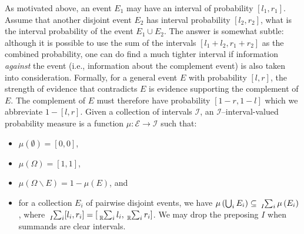 \documentclass{article}
\theoremstyle{remark}
\newcommand{\events}{\ensuremath{\mathcal{E}}}
\newcommand{\pmeas}{\ensuremath{\mu}}
\newcommand{\necess}{{\mbox{\wesa{certain}}}}
\newcommand{\yutsung}[1]{\fbox{\begin{minipage}{0.9\textwidth}\color{purple}{Yu-Tsung says: #1}\end{minipage}}}
\begin{document}
As motivated above, an event $E_1$ may have an interval of probability
$[l_1,r_1]$. Assume that another disjoint event $E_2$ has interval
probability $[l_2,r_2]$, what is the interval probability of the event
$E_1 \cup E_2$. The answer is somewhat subtle: although it is possible
to use the sum of the intervals $[l_1+l_2,r_1+r_2]$ as the combined
probability, one can do find a much tighter interval if information
\emph{against} the event (i.e., information about the complement
event) is also taken into consideration. Formally, for a general event
$E$ with probability $[l,r]$, the strength of evidence that
contradicts $E$ is evidence supporting the complement of $E$. The
complement of $E$ must therefore have probability
$\left[1-r,1-l\right]$ which we abbreviate $1-\left[l,r\right]$. Given
a collection of intervals $\mathscr{I}$, an
$\mathscr{I}$--interval-valued probability measure is a function
$\pmeas : \events \rightarrow \mathscr{I}$ such that:
\begin{itemize}
\item $\pmeas(\emptyset)=[0,0]$, 
\item $\pmeas(\Omega)=[1,1]$, 
\item $\pmeas\left(\Omega\backslash E\right)=1-\pmeas\left(E\right)$,
  and 
\item for a collection $E_{i}$ of pairwise disjoint events, we have $\pmeas\left(\bigcup_{i}E_{i}\right)\subseteq\tensor*[_{I}]{\sum}{_{i}}\pmeas\left(E_{i}\right)$,
where $\tensor*[_{I}]{\sum}{_{i}}[l_{i},r_{i}]=\left[\tensor*[_{\mathbb{R}}]{\sum}{_{i}}l_{i},\tensor*[_{\mathbb{R}}]{\sum}{_{i}}r_{i}\right]$.
We may drop the preposing $I$ when summands are clear intervals. 
\end{itemize}


\end{document}
